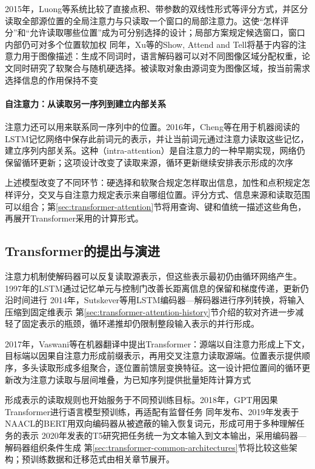 2015年，Luong等系统比较了直接点积、带参数的双线性形式等评分方式，并区分读取全部源位置的全局注意力与只读取一个窗口的局部注意力。这使“怎样评分”和“允许读取哪些位置”成为可分别选择的设计；局部方案规定候选窗口，窗口内部仍可对多个位置软加权 同年，Xu等的Show, Attend and Tell将基于内容的注意力用于图像描述：生成不同词时，语言解码器可以对不同图像区域分配权重，论文同时研究了软聚合与随机硬选择。被读取对象由源词变为图像区域，按当前需求选择信息的作用保持不变

\paragraph{自注意力：从读取另一序列到建立内部关系}
注意力还可以用来联系同一序列中的位置。2016年，Cheng等在用于机器阅读的LSTM记忆网络中保存此前词元的表示，并让当前词元通过注意力读取这些记忆，建立序列内部关系。这种（intra-attention）是自注意力的一种早期实现，网络仍保留循环更新；这项设计改变了读取来源，循环更新继续安排表示形成的次序

上述模型改变了不同环节：硬选择和软聚合规定怎样取出信息，加性和点积规定怎样评分，交叉与自注意力规定表示来自哪组位置。评分方式、信息来源和读取范围可以组合；第\ref{sec:transformer-attention}节将用查询、键和值统一描述这些角色，再展开Transformer采用的计算形式。

\subsection{Transformer的提出与演进}
\label{sec:transformer-architecture-history}

注意力机制使解码器可以反复读取源表示，但这些表示最初仍由循环网络产生。1997年的LSTM通过记忆单元与控制门改善长距离信息的保留和梯度传递，更新仍沿时间进行 2014年，Sutskever等用LSTM编码器—解码器进行序列转换，将输入压缩到固定维表示 第\ref{sec:transformer-attention-history}节介绍的软对齐进一步减轻了固定表示的瓶颈，循环递推却仍限制整段输入表示的并行形成。

2017年，Vaswani等在机器翻译中提出Transformer：源端以自注意力形成上下文，目标端以因果自注意力形成前缀表示，再用交叉注意力读取源端。位置表示提供顺序，多头读取形成多组聚合，逐位置前馈层变换特征。这一设计把位置间的循环更新改为注意力读取与层间堆叠，为已知序列提供批量矩阵计算方式

\Needspace{165mm}
形成表示的读取规则也开始服务于不同预训练目标。2018年，GPT用因果Transformer进行语言模型预训练，再适配有监督任务 同年发布、2019年发表于NAACL的BERT用双向编码器从被遮蔽的输入恢复词元，形成可用于多种理解任务的表示 2020年发表的T5研究把任务统一为文本输入到文本输出，采用编码器—解码器组织条件生成 第\ref{sec:transformer-common-architectures}节将比较这些架构；预训练数据和迁移范式由相关章节展开。

